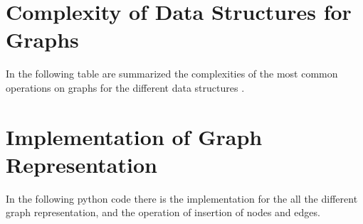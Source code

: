 \chapter{Complexity of Data Structures for Graphs}
\label{graphsappendix}
In the following table are summarized the complexities of the most common operations on graphs for the different data structures \cite{goodrich2013data}.

\chapter{Implementation of Graph Representation}
\label{graphimplementationappendix}
In the following python code there is the implementation for the all the different graph representation, and the operation of insertion of nodes and edges.


